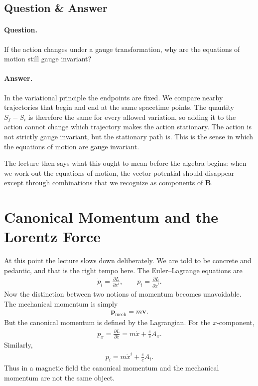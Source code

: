 \subsection{Question \& Answer}

\paragraph{Question.} If the action changes under a gauge transformation, why are the equations of motion still gauge invariant?

\paragraph{Answer.} In the variational principle the endpoints are fixed. We compare nearby trajectories that begin and end at the same spacetime points. The quantity \(S_f-S_i\) is therefore the same for every allowed variation, so adding it to the action cannot change which trajectory makes the action stationary. The action is not strictly gauge invariant, but the stationary path is. This is the sense in which the equations of motion are gauge invariant.

The lecture then says what this ought to mean before the algebra begins: when we work out the equations of motion, the vector potential should disappear except through combinations that we recognize as components of \(\mathbf B\).

\section{Canonical Momentum and the Lorentz Force}

At this point the lecture slows down deliberately. We are told to be concrete and pedantic, and that is the right tempo here. The Euler--Lagrange equations are
\begin{align}
\dot p_i=\frac{\partial L}{\partial x^i},
\qquad
p_i=\frac{\partial L}{\partial \dot x^i}.
\end{align}
Now the distinction between two notions of momentum becomes unavoidable. The mechanical momentum is simply
\begin{align}
\mathbf p_{\mathrm{mech}}=m\mathbf v.
\end{align}
But the canonical momentum is defined by the Lagrangian. For the \(x\)-component,
\begin{align}
p_x=\frac{\partial L}{\partial \dot x}=m\dot x+\frac{e}{c}A_x.
\end{align}
Similarly,
\begin{align}
p_i=m\dot x^i+\frac{e}{c}A_i.
\end{align}
Thus in a magnetic field the canonical momentum and the mechanical momentum are not the same object.

